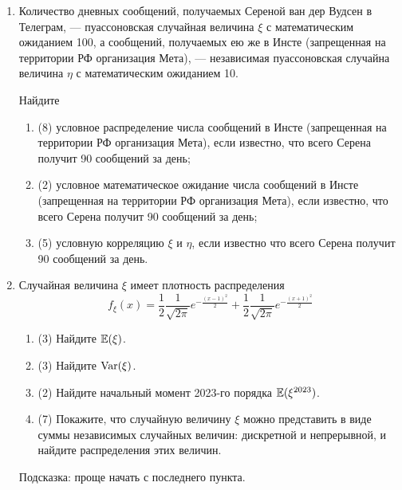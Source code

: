 \begin{enumerate}
    \item Количество дневных сообщений, получаемых Сереной ван дер Вудсен в Телеграм, 
    — пуассоновская случайная величина $\xi$ с математическим ожиданием 100, а сообщений, 
    получаемых ею же в Инсте (запрещенная на территории РФ организация Мета), 
    — независимая пуассоновская случайна величина $\eta$ с математическим ожиданием 10. 
    
    Найдите 
	\begin{enumerate}
	\item (8) условное распределение числа сообщений в Инсте (запрещенная на территории РФ организация Мета), если известно, что всего Серена получит 90 сообщений за день;
	\item (2) условное математическое ожидание числа сообщений в Инсте (запрещенная на территории РФ организация Мета), если известно, что всего Серена получит 90 сообщений за день;
	\item (5) условную корреляцию $\xi$ и $\eta$, если известно что всего Серена получит 90 сообщений за день.
	\end{enumerate}
	
	
	\item Случайная величина $\xi$ имеет плотность распределения 
\[
    f_{\xi}(x)=\frac{1}{2} \frac{1}{\sqrt{2 \pi}} e^{-\frac{(x-1)^2}{2}}+\frac{1}{2} \frac{1}{\sqrt{2 \pi}} e^{-\frac{(x+1)^2}{2}}
\]
	\begin{enumerate}
		\item (3) Найдите  $\operatorname{\mathbb{E}}(\xi)$.
		\item (3) Найдите $\operatorname{Var}(\xi)$.
		\item (2) Найдите  начальный момент 2023-го порядка $\operatorname{\mathbb{E}}(\xi^{2023})$.
		\item (7) Покажите, что случайную величину $\xi$ можно представить в виде суммы независимых случайных величин: дискретной и непрерывной, и найдите распределения этих величин.
	\end{enumerate}
	Подсказка: проще начать с последнего пункта.

\end{enumerate}
